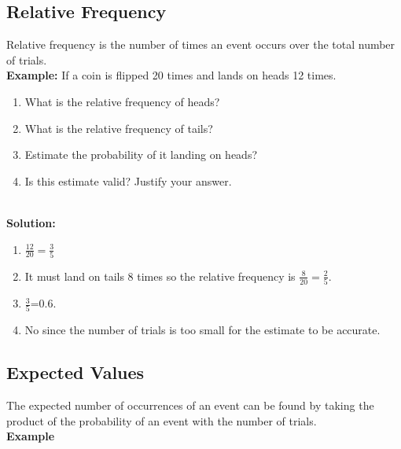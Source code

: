 \documentclass{article}
\begin{document}
\newpage

\subsection{Relative Frequency}

Relative frequency is the number of times an event occurs over the total number of trials.
\\

\textbf{Example:} If a coin is flipped 20 times and lands on heads 12 times.

\begin{enumerate}
    \begin{enumerate}
         \item What is the relative frequency of heads?
        \item What is the relative frequency of tails?
        \item Estimate the probability of it landing on heads?
        \item Is this estimate valid? Justify your answer.
    \end{enumerate}

\end{enumerate}

\\

\textbf{Solution:}

\begin{enumerate}
    \begin{enumerate}
        \item \(\frac{12}{20} = \frac{3}{5}\)
        \item It must land on tails 8 times so the relative frequency is \(\frac{8}{20}=\frac{2}{5}\).
        \item \(\frac{3}{5}\)=0.6.
        \item No since the number of trials is too small for the estimate to be accurate.
    \end{enumerate}
\end{enumerate}

\subsection{Expected Values}

The expected number of occurrences of an event can be found by taking the product of the probability of an event with the number of trials.
\\

\textbf{Example}
\end{document}
